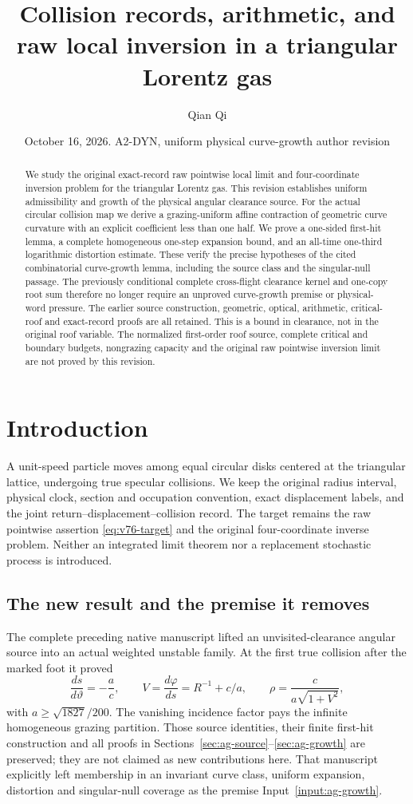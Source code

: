 \documentclass[11pt,reqno]{amsart}
\title[Collision records and raw local inversion]{Collision records, arithmetic, and raw local inversion in a triangular Lorentz gas}
\author{Qian Qi}
\date{October 16, 2026. A2-DYN, uniform physical curve-growth author revision}
\numberwithin{equation}{section}
\theoremstyle{definition}\newtheorem{definition}[theorem]{Definition}
\theoremstyle{remark}\newtheorem{remark}[theorem]{Remark}
\begin{document}
\raggedbottom
\begin{abstract}
We study the original exact-record raw pointwise local limit and
four-coordinate inversion problem for the triangular Lorentz gas. This
revision establishes uniform admissibility and growth of the physical
angular clearance source. For the actual circular collision map we derive
a grazing-uniform affine contraction of geometric curve curvature with an
explicit coefficient less than one half. We prove a one-sided first-hit
lemma, a complete homogeneous one-step expansion bound, and an all-time
one-third logarithmic distortion estimate. These verify the precise
hypotheses of the cited combinatorial curve-growth lemma, including the
source class and the singular-null passage. The previously conditional
complete cross-flight clearance kernel and one-copy root sum therefore
no longer require an unproved curve-growth premise or physical-word
pressure. The earlier source construction, geometric, optical, arithmetic,
critical-roof and exact-record proofs are all retained. This is a bound
in clearance, not in the original roof variable. The normalized
first-order roof source, complete critical and boundary budgets,
nongrazing capacity and the original raw pointwise inversion limit are
not proved by this revision.
\end{abstract}
\maketitle
\enlargethispage{8pt}

\section*{Introduction}
A unit-speed particle moves among equal circular disks centered at the
triangular lattice, undergoing true specular collisions. We keep the
original radius interval, physical clock, section and occupation convention,
exact displacement labels, and the joint return--displacement--collision
record. The target remains the raw pointwise assertion
\eqref{eq:v76-target} and the original four-coordinate inverse problem.
Neither an integrated limit theorem nor a replacement stochastic process
is introduced.

\subsection*{The new result and the premise it removes}
The complete preceding native manuscript lifted an unvisited-clearance
angular source into an actual weighted unstable family. At the first true
collision after the marked foot it proved
\[
 \frac{ds}{d\vartheta}=-\frac ac,\qquad
 V=\frac{d\varphi}{ds}=R^{-1}+c/a,\qquad
 \rho=\frac{c}{a\sqrt{1+V^2}},
\]
with $a\ge\sqrt{1827}/200$. The vanishing incidence factor pays the
infinite homogeneous grazing partition. Those source identities, their
finite first-hit construction and all proofs in
Sections~\ref{sec:ag-source}--\ref{sec:ag-growth} are preserved; they
are not claimed as new contributions here. That manuscript explicitly
left membership in an invariant curve class, uniform expansion,
distortion and singular-null coverage as the premise
Input~\ref{input:ag-growth}.
\end{document}
